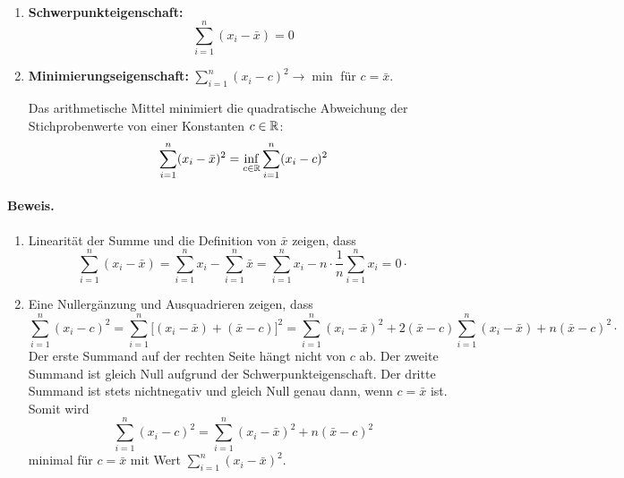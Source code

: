 \begin{satz}
     \\
    \begin{enumerate}[label=(\alph*)]
        \item \textbf{Schwerpunkteigenschaft:}
        \[
            \sum_{i=1}^n (x_i-\bar x) = 0
        \]
        \item \textbf{Minimierungseigenschaft:} $\displaystyle\sum_{i=1}^n (x_i-c)^2 \to \min$ für $c=\bar x$.

        Das arithmetische Mittel minimiert die quadratische Abweichung der Stichprobenwerte von einer Konstanten $c\in\mathbb{R}$:
        \[
            \sum_{i=1}^n (x_i-\bar x)^2 = \inf_{c\in\mathbb{R}} \sum_{i=1}^n (x_i-c)^2
        \]
    \end{enumerate}

    \paragraph{Beweis.}
    \begin{enumerate}[label=(\alph*)]
        \item Linearität der Summe und die Definition von $\bar x$ zeigen, dass
        \[
            \sum_{i=1}^n (x_i-\bar x) = \sum_{i=1}^n x_i - \sum_{i=1}^n \bar x = \sum_{i=1}^n x_i - n\cdot\frac1n\sum_{i=1}^n x_i = 0 \cdot
        \]
        \item Eine Nullergänzung und Ausquadrieren zeigen, dass
        \[
            \sum_{i=1}^n (x_i-c)^2 = \sum_{i=1}^n \big[(x_i-\bar x)+(\bar x-c)\big]^2 = \sum_{i=1}^n (x_i-\bar x)^2 + 2(\bar x-c)\sum_{i=1}^n (x_i-\bar x) + n(\bar x-c)^2 \cdot
        \]
        Der erste Summand auf der rechten Seite hängt nicht von $c$ ab.
        Der zweite Summand ist gleich Null aufgrund der Schwerpunkteigenschaft.
        Der dritte Summand ist stets nichtnegativ und gleich Null genau dann, wenn $c=\bar x$ ist.
        Somit wird
        \[
            \sum_{i=1}^n (x_i-c)^2 = \sum_{i=1}^n (x_i-\bar x)^2 + n(\bar x-c)^2
        \]
        minimal für $c=\bar x$ mit Wert $\sum_{i=1}^n (x_i-\bar x)^2$. \qedhere
    \end{enumerate}
\end{satz}

